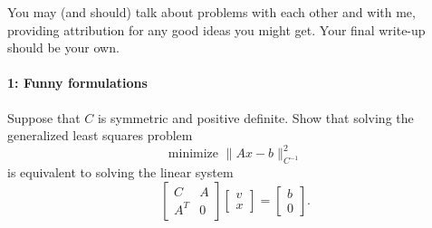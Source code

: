 \documentclass[12pt, leqno]{article} %
\begin{document}

You may (and should) talk about problems with each other and with me,
providing attribution for any good ideas you might get.  Your final
write-up should be your own.

\paragraph*{1: Funny formulations}
Suppose that $C$ is symmetric and positive definite.  Show that
solving the generalized least squares problem
\[
  \mbox{minimize } \|Ax-b\|_{C^{-1}}^2
\]
is equivalent to solving the linear system
\[
  \begin{bmatrix} C & A \\ A^T & 0 \end{bmatrix}
  \begin{bmatrix} v \\ x \end{bmatrix} =
  \begin{bmatrix} b \\ 0 \end{bmatrix}.
\]
\end{document}
